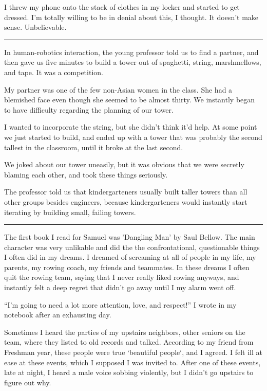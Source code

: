 I threw my phone onto the stack of clothes in my locker and started to get
dressed.  I'm totally willing to be in denial about this, I thought.  It doesn't
make sense.  Unbelievable. 

\plainfancybreak{12pt}{2}{* * *}

In human-robotics interaction, the young professor told us to find a partner,
and then gave us five minutes to build a tower out of spaghetti, string,
marshmellows, and tape.  It was a competition.

My partner was one of the few non-Asian women in the class.  She had a blemished
face even though she seemed to be almost thirty.  We instantly began to have
difficulty regarding the planning of our tower.  

I wanted to incorporate the string, but she didn't think it'd help.  At some
point we just started to build, and ended up with a tower that was probably the
second tallest in the classroom, until it broke at the last second.

We joked about our tower uneasily, but it was obvious that we were secretly
blaming each other, and took these things seriously.

The professor told us that kindergarteners usually built taller towers than all
other groups besides engineers, because kindergarteners would instantly start
iterating by building small, failing towers. 

\plainfancybreak{12pt}{2}{* * *}

The first book I read for Samuel was 'Dangling Man' by Saul Bellow.  The main
character was very unlikable and did the the confrontational, questionable
things I often did in my dreams.  I dreamed of screaming at all of people in my
life, my parents, my rowing coach, my friends and teammates.  In these dreams I
often quit the rowing team, saying that I never really liked rowing anyways, and
instantly felt a deep regret that didn't go away until I my alarm went off.

``I'm going to need a lot more attention, love, and respect!'' I wrote in my
notebook after an exhausting day.  



Sometimes I heard the parties of my upstairs neighbors, other seniors on the
team, where they listed to old records and talked.  According to my friend from
Freshman year, these people were true `beautiful people`, and I agreed.  I felt
ill at ease at these events, which I supposed I was invited to.  After one of
these events, late at night, I heard a male voice sobbing violently, but I
didn't go upstairs to figure out why.

